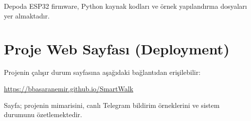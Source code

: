 Depoda ESP32 firmware, Python kaynak kodları ve örnek yapılandırma dosyaları yer almaktadır.

\section{Proje Web Sayfası (Deployment)}
\label{ek:deployment}

Projenin çalışır durum sayfasına aşağıdaki bağlantıdan erişilebilir:

\begin{center}
  \url{https://bbasaranemir.github.io/SmartWalk}
\end{center}

Sayfa; projenin mimarisini, canlı Telegram bildirim örneklerini ve sistem durumunu özetlemektedir.
